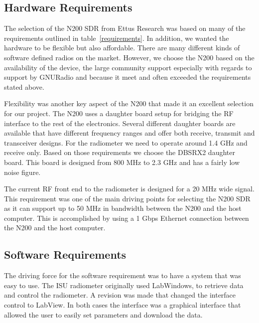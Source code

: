 \subsection{Hardware Requirements}

The selection of the N200 SDR from Ettus Research was based on many of the requirements outlined in table~\ref{requirements}.  In addition, we wanted the hardware to be flexible but also affordable.  There are many different kinds of software defined radios on the market.  However, we choose the N200 based on the availability of the device, the large community support especially with regards to support by GNURadio and because it meet and often exceeded the requirements stated above.  

Flexibility was another key aspect of the N200 that made it an excellent selection for our project.  The N200 uses a daughter board setup for bridging the RF interface to the rest of the electronics.  Several different daughter boards are available that have different frequency ranges and offer both receive, transmit and transceiver designs.  For the radiometer we need to operate around 1.4 GHz and receive only.  Based on those requirements we choose the DBSRX2 daughter board.  This board is designed from 800 MHz to 2.3 GHz and has a fairly low noise figure.   


The current RF front end to the radiometer is designed for a 20 MHz wide signal.  This requirement was one of the main driving points for selecting the N200 SDR as it can support up to 50 MHz in bandwidth between the N200 and the host computer.  This is accomplished by using a 1 Gbps Ethernet connection between the N200 and the host computer.


\subsection{Software Requirements}

The driving force for the software requirement was to have a system that was easy to use.  The ISU radiometer originally used LabWindows, to retrieve data and control the radiometer.  A revision was made that changed the interface control to LabView.  In both cases the interface was a graphical interface that allowed the user to easily set parameters and download the data.

